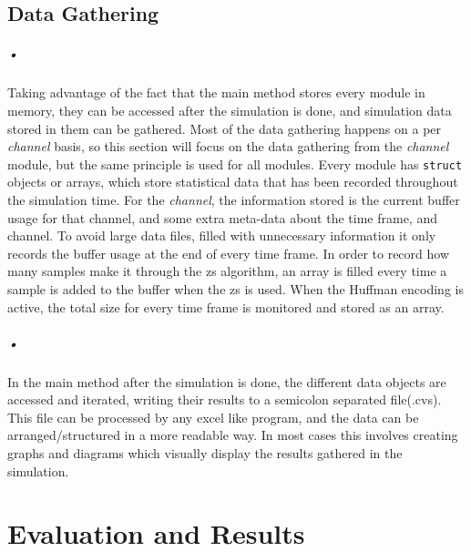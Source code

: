 \documentclass[a4paper, 12pt]{report}
\newcommand{\codeword}[1]{\texttt{#1}}
\begin{document}
\begin{minipage}{\linewidth}

\end{minipage}

\section{Data Gathering}

\paragraph{•}
Taking advantage of the fact that the main method stores every module in memory, they can be accessed after the simulation is done, and simulation data stored in them can be gathered.
Most of the data gathering happens on a per \textit{channel} basis, so this section will focus on the data gathering from the \textit{channel} module, but the same principle is used for all modules.
Every module has \codeword{struct} objects or arrays, which store statistical data that has been recorded throughout the simulation time.
For the \textit{channel}, the information stored is the current buffer usage for that channel, and some extra meta-data about the time frame, and channel.
To avoid large data files, filled with unnecessary information it only records the buffer usage at the end of every time frame.
In order to record how many samples make it through the \gls{zs} algorithm, an array is filled every time a sample is added to the buffer when the \gls{zs} is used.
When the Huffman encoding is active, the total size for every time frame is monitored and stored as an array.

\paragraph{•}
In the main method after the simulation is done, the different data objects are accessed and iterated, writing their results to a semicolon separated file(.cvs).
This file can be processed by any excel like program, and the data can be arranged/structured in a more readable way.
In most cases this involves creating graphs and diagrams which visually display the results gathered in the simulation.

\chapter{Evaluation and Results}
\end{document}
